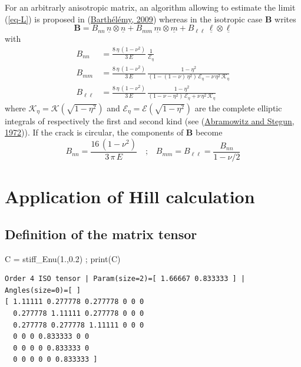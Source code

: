\documentclass[
  letterpaper,
  DIV=11,
  numbers=noendperiod]{scrreprt}
\newenvironment{Shaded}{\begin{snugshade}}{\end{snugshade}}
\newcommand{\BuiltInTok}[1]{\textcolor[rgb]{0.00,0.23,0.31}{#1}}
\newcommand{\FloatTok}[1]{\textcolor[rgb]{0.68,0.00,0.00}{#1}}
\newcommand{\NormalTok}[1]{\textcolor[rgb]{0.00,0.23,0.31}{#1}}
\newcommand{\OperatorTok}[1]{\textcolor[rgb]{0.37,0.37,0.37}{#1}}
\newcommand{\uu}[1]{{\symbf{{#1}}}}
\newcommand{\uv}[1]{{\underline{{#1}}}}
\begin{document}
For an arbitrarly anisotropic matrix, an algorithm allowing to estimate
the limit (\ref{eq-L}) is proposed in
(\protect\hyperlink{ref-barthelemyIJSS2009}{Barthélémy, 2009}) whereas
in the isotropic case \(\uu{B}\) writes \[
\uu{B}=
B_{nn}\,\uv{n}\otimes\uv{n}
+
B_{mm}\,\uv{m}\otimes\uv{m}
+
B_{\ell\ell}\,\uv{\ell}\otimes\uv{\ell}
\] with \[\begin{aligned}
B_{nn}&=\frac{8\,\eta\,(1-\nu^2)}{3\,E}\,
\frac{1}{\mathcal{E}_\eta}\label{eq:Bnn}\\
B_{mm}&=\frac{8\,\eta\,(1-\nu^2)}{3\,E}\,
\frac{1-\eta^2}{\left(1-(1-\nu)\,\eta^2\right)
\,\mathcal{E}_\eta-\nu\,\eta^2\,\mathcal{K}_\eta}\\
B_{\ell\ell}&=\frac{8\,\eta\,(1-\nu^2)}{3\,E}\,
\frac{1-\eta^2}{(1-\nu-\eta^2)\,\mathcal{E}_\eta+\nu\,\eta^2\,\mathcal{K}_\eta}
\end{aligned}\] where \(\mathcal{K}_\eta=\mathcal{K}(\sqrt{1-\eta^2})\)
and \(\mathcal{E}_\eta=\mathcal{E}(\sqrt{1-\eta^2})\) are the complete
elliptic integrals of respectively the first and second kind (see
(\protect\hyperlink{ref-abramowitz1972}{Abramowitz and Stegun, 1972})).
If the crack is circular, the components of \(\uu{B}\) become \[
B_{nn}=\frac{16\,(1-\nu^2)}{3\,\pi\,E}
\quad\textrm{;}\quad
B_{mm}=B_{\ell\ell}=\frac{B_{nn}}{1-\nu/2}
\]

\hypertarget{application-of-hill-calculation}{%
\section{Application of Hill
calculation}\label{application-of-hill-calculation}}

\hypertarget{definition-of-the-matrix-tensor}{%
\subsection{Definition of the matrix
tensor}\label{definition-of-the-matrix-tensor}}

\begin{Shaded}
\begin{Highlighting}[]
\NormalTok{C }\OperatorTok{=}\NormalTok{ stiff\_Enu(}\FloatTok{1.}\NormalTok{,}\FloatTok{0.2}\NormalTok{) }\OperatorTok{;} \BuiltInTok{print}\NormalTok{(C)}
\end{Highlighting}
\end{Shaded}

\begin{verbatim}
Order 4 ISO tensor | Param(size=2)=[ 1.66667 0.833333 ] | Angles(size=0)=[ ]
[ 1.11111 0.277778 0.277778 0 0 0 
  0.277778 1.11111 0.277778 0 0 0 
  0.277778 0.277778 1.11111 0 0 0 
  0 0 0 0.833333 0 0 
  0 0 0 0 0.833333 0 
  0 0 0 0 0 0.833333 ]
\end{verbatim}
\end{document}
